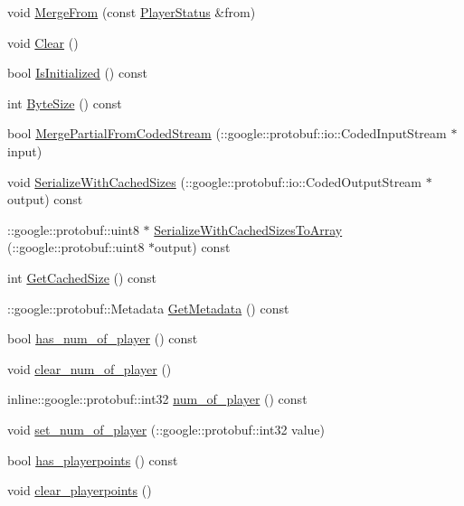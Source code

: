 \begin{DoxyCompactItemize}
void \hyperlink{class_player_status_a299630c8c40e216a67c3a6f7b9af6e71}{Merge\-From} (const \hyperlink{class_player_status}{Player\-Status} \&from)
\item 
void \hyperlink{class_player_status_a869a9837799852d1d5c4c30cefd495a8}{Clear} ()
\item 
bool \hyperlink{class_player_status_af77a5dbd97872bc975b8b3a0804ea84e}{Is\-Initialized} () const 
\item 
int \hyperlink{class_player_status_a1b4ef50237a9ec0e43325b60083c0660}{Byte\-Size} () const 
\item 
bool \hyperlink{class_player_status_a9616d3aa3ea0be9520e04b51540de136}{Merge\-Partial\-From\-Coded\-Stream} (\-::google\-::protobuf\-::io\-::\-Coded\-Input\-Stream $\ast$input)
\item 
void \hyperlink{class_player_status_a35cd38f2703b11a1966b345b83235917}{Serialize\-With\-Cached\-Sizes} (\-::google\-::protobuf\-::io\-::\-Coded\-Output\-Stream $\ast$output) const 
\item 
\-::google\-::protobuf\-::uint8 $\ast$ \hyperlink{class_player_status_a1886db442fd6e7d70710692d9f0c78ec}{Serialize\-With\-Cached\-Sizes\-To\-Array} (\-::google\-::protobuf\-::uint8 $\ast$output) const 
\item 
int \hyperlink{class_player_status_ab8f15398fd55d9c9beb952376db309c1}{Get\-Cached\-Size} () const 
\item 
\-::google\-::protobuf\-::\-Metadata \hyperlink{class_player_status_a3f6074ac088b9fdfc53961998908498c}{Get\-Metadata} () const 
\item 
bool \hyperlink{class_player_status_a87a6e0694705a02266e19a0431dcc8bd}{has\-\_\-num\-\_\-of\-\_\-player} () const 
\item 
void \hyperlink{class_player_status_a4ad8dc674124a3f60415fdc42f9bb145}{clear\-\_\-num\-\_\-of\-\_\-player} ()
\item 
inline\-::google\-::protobuf\-::int32 \hyperlink{class_player_status_a44687f76d5e97b584660fbab2441b069}{num\-\_\-of\-\_\-player} () const 
\item 
void \hyperlink{class_player_status_a629692934e938d6f22d32ea5e595d788}{set\-\_\-num\-\_\-of\-\_\-player} (\-::google\-::protobuf\-::int32 value)
\item 
bool \hyperlink{class_player_status_ac13cb145ece1931f7cafb4ce6190a77f}{has\-\_\-playerpoints} () const 
\item 
void \hyperlink{class_player_status_aef1e2bbad803ac9ddcd33b3ee3f6bd98}{clear\-\_\-playerpoints} ()
\item 

\end{DoxyCompactItemize}
